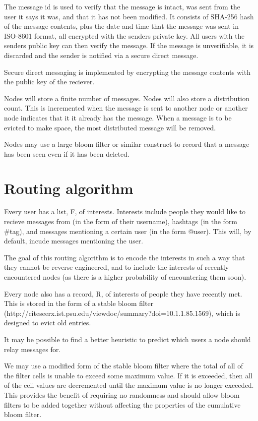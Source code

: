 \documentclass{article}
\begin{document}
The message id is used to verify that the message is intact, was sent from the user it says it was, and that it has not been modified. It consists of SHA-256 hash of the message contents, plus the date and time that the message was sent in ISO-8601 format, all encrypted with the senders private key. All users with the senders public key can then verify the message. If the message is unverifiable, it is discarded and the sender is notified via a secure direct message.

Secure direct messaging is implemented by encrypting the message contents with the public key of the reciever.

Nodes will store a finite number of messages. Nodes will also store a distribution count. This is incremented when the message is sent to another node or another node indicates that it it already has the message. When a message is to be evicted to make space, the most distributed message will be removed.

Nodes may use a large bloom filter or similar construct to record that a message has been seen even if it has been deleted.

\section*{Routing algorithm}
Every user has a list, F, of interests. Interests include people they would like to recieve messages from (in the form of their username), hashtags (in the form \#tag), and messages mentioning a certain user (in the form @user). This will, by default, incude messages mentioning the user.

The goal of this routing algorithm is to encode the interests in such a way that they cannot be reverse engineered, and to include the interests of recently encountered nodes (as there is a higher probability of encountering them soon).

Every node also has a record, R, of interests of people they have recently met. This is stored in the form of a stable bloom filter (http://citeseerx.ist.psu.edu/viewdoc/summary?doi=10.1.1.85.1569), which is designed to evict old entries.

It may be possible to find a better heuristic to predict which users a node should relay messages for.

We may use a modified form of the stable bloom filter where the total of all of the filter cells is unable to exceed some maximum value. If it is exceeded, then all of the cell values are decremented until the maximum value is no longer exceeded. This provides the benefit of requiring no randomness and should allow bloom filters to be added together without affecting the properties of the cumulative bloom filter.
\end{document}
